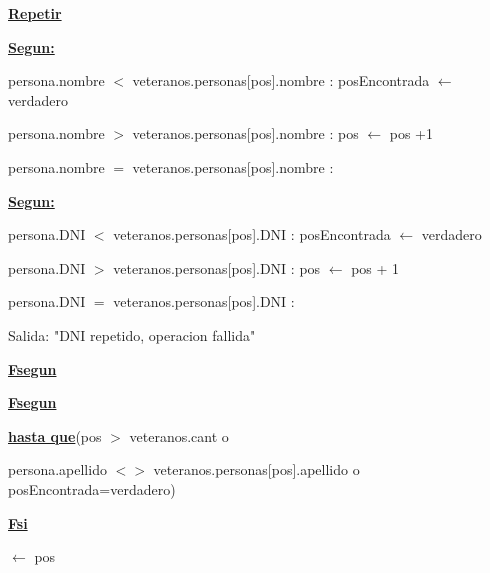 \documentclass{article}
\begin{document}
                \hspace{16mm}\underline{\textbf{Repetir}}

                    \hspace{20mm}\underline{\textbf{Segun:}} 

                        \hspace{24mm} persona.nombre $<$ veteranos.personas[pos].nombre : posEncontrada $\leftarrow$ verdadero

                        \hspace{24mm} persona.nombre $>$ veteranos.personas[pos].nombre : pos $\leftarrow$ pos +1

                        \hspace{24mm} persona.nombre $=$ veteranos.personas[pos].nombre :

                            \hspace{28mm} \underline{\textbf{Segun:}}

                                \hspace{32mm} persona.DNI $<$ veteranos.personas[pos].DNI : posEncontrada $\leftarrow$ verdadero

                                \hspace{32mm} persona.DNI $>$ veteranos.personas[pos].DNI : pos $\leftarrow$ pos + 1

                                \hspace{32mm} persona.DNI $=$ veteranos.personas[pos].DNI : 

                                    \hspace{36mm} Salida: "DNI repetido, operacion fallida"

                            \hspace{28mm}\underline{\textbf{Fsegun}}

                    \hspace{20mm}\underline{\textbf{Fsegun}}

                \hspace{16mm}\underline{\textbf{hasta que}}(pos $>$ veteranos.cant o
                    
                    \hspace{24mm}persona.apellido $<>$ veteranos.personas[pos].apellido o posEncontrada=verdadero)

            \hspace{12mm}\underline{\textbf{Fsi}}

            \hspace{12mm}$\leftarrow$ pos
\end{document}
